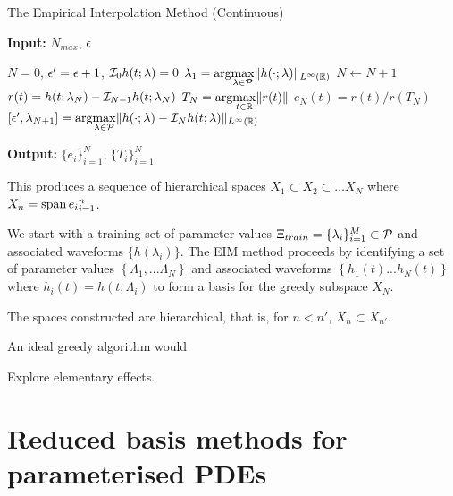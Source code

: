 \begin{algorithm}
\caption{The Empirical Interpolation Method (Continuous)}\label{alg:EIMc}
\textbf{Input:} $N_{max}$, ${\epsilon}$
\begin{algorithmic}[1]
\State $N=0$, ${\epsilon}'={\epsilon}+1$,  $\mathcal{I}_0 h(t;\lambda)=0$
\State $\lambda_1=\mbox{arg}\underset{\lambda \in \mathcal{P}}{\max}\|h(\cdot;\lambda)\|_{L^\infty({\mathbb R})}$
\State $N \gets N+1$
\State $r(t)=h(t; \lambda_N)-\mathcal{I}_{N-1}h(t;\lambda_N)$
\State $T_N=\mbox{arg}\underset{t \in {\mathbb R}}{\max} \|r(t) \|$
\State $e_N(t)=r(t)/r(T_N)$
\State $[{\epsilon}', \lambda_{N+1}]=\mbox{arg}\underset{\lambda \in \mathcal{P}}{\max}\|h(\cdot;\lambda)-\mathcal{I}_{N}h(t;\lambda)\|_{L^\infty({\mathbb R})}$
\EndWhile
\end{algorithmic}
\textbf{Output:} $\{e_i\}_{i=1}^N$, $\{T_i\}_{i=1}^{N}$
\end{algorithm}

This produces a sequence of hierarchical spaces $X_1 \subset X_2 \subset \ldots X_N$ where $X_n=\operatorname{span}{e_i}_{i=1}^n$. 

We start with a training set of parameter values $\Xi_{train}=\{\lambda_i\}_{i=1}^M \subset \mathcal{P}$ and associated waveforms $\{h(\lambda_i)\}$. The EIM method proceeds by identifying a set of parameter values $\left\lbrace \Lambda_1, ... \Lambda_N \right\rbrace$ and associated waveforms $ \left\lbrace h_1(t) ... h_N(t) \right\rbrace$ where $h_i(t)=h(t; \Lambda_i)$ to form a basis for the greedy subspace $X_N$. 


The spaces constructed are hierarchical, that is, for $n<n'$, $X_n \subset X_{n'}$. 

An ideal greedy algorithm would 


Explore elementary effects.

\chapter{Reduced basis methods for parameterised PDEs}


